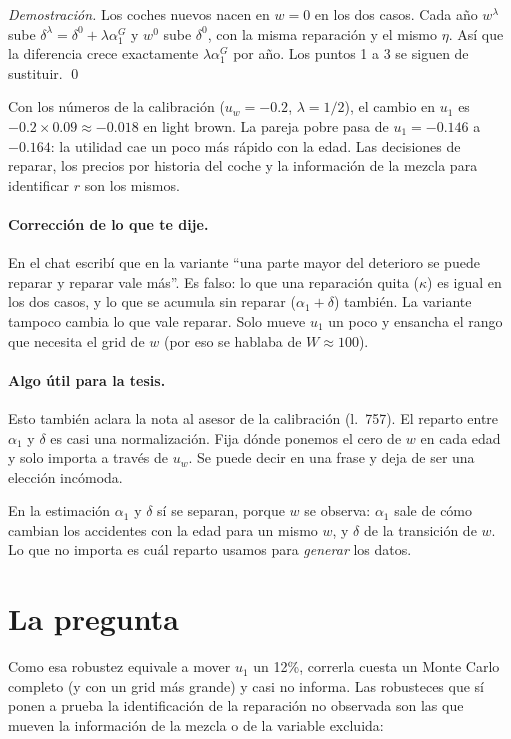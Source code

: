 \documentclass[11pt]{article}
\begin{document}
\noindent
\textit{Demostración.} Los coches nuevos nacen en $w=0$ en los dos casos. Cada año
$w^\lambda$ sube $\delta^\lambda=\delta^0+\lambda\alpha^G_1$ y $w^0$ sube $\delta^0$, con la
misma reparación y el mismo $\eta$. Así que la diferencia crece exactamente
$\lambda\alpha^G_1$ por año. Los puntos 1 a 3 se siguen de sustituir. \qed

\medskip
Con los números de la calibración ($u_w=-0.2$, $\lambda=1/2$), el cambio en $u_1$ es
$-0.2\times0.09\approx-0.018$ en light brown. La pareja pobre pasa de $u_1=-0.146$ a $-0.164$:
la utilidad cae un poco más rápido con la edad. Las decisiones de reparar, los precios por
historia del coche y la información de la mezcla para identificar $r$ son los mismos.

\paragraph{Corrección de lo que te dije.} En el chat escribí que en la variante ``una parte
mayor del deterioro se puede reparar y reparar vale más''. Es falso: lo que una reparación
quita ($\kappa$) es igual en los dos casos, y lo que se acumula sin reparar ($\alpha_1+\delta$)
también. La variante tampoco cambia lo que vale reparar. Solo mueve $u_1$ un poco y ensancha
el rango que necesita el grid de $w$ (por eso se hablaba de $W\approx100$).

\paragraph{Algo útil para la tesis.} Esto también aclara la nota al asesor de la
calibración (l.~757). El reparto entre $\alpha_1$ y $\delta$ es casi una normalización. Fija
dónde ponemos el cero de $w$ en cada edad y solo importa a través de $u_w$. Se puede decir en
una frase y deja de ser una elección incómoda.

En la estimación $\alpha_1$ y $\delta$ sí se separan, porque $w$ se observa: $\alpha_1$ sale de
cómo cambian los accidentes con la edad para un mismo $w$, y $\delta$ de la transición de $w$.
Lo que no importa es cuál reparto usamos para \emph{generar} los datos.

\section{La pregunta}

Como esa robustez equivale a mover $u_1$ un 12\%, correrla cuesta un Monte Carlo completo
(y con un grid más grande) y casi no informa. Las robusteces que sí ponen a prueba la
identificación de la reparación no observada son las que mueven la información de la mezcla
o de la variable excluida:
\end{document}
